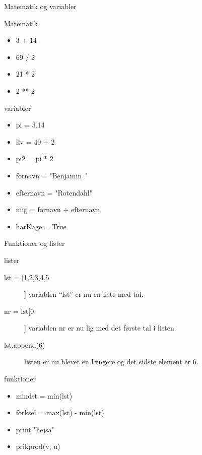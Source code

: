 \documentclass[12pt,t]{beamer}
\begin{document}
     \begin{frame}{Matematik og variabler}
         \vspace{-1em}
         \begin{block}{Matematik}
            \begin{itemize}
                \item 3 + 14 \pause
                \item 69 / 2 \pause
                \item 21 * 2 \pause
                \item 2 ** 2
            \end{itemize}
         \end{block}
         \pause
         \begin{block}{variabler}
             \begin{itemize}
                 \item pi  = 3.14
                \pause \item liv = 40 + 2
                \pause \item pi2 = pi * 2
                \pause \item fornavn = "Benjamin~"
                \pause \item efternavn = "Rotendahl"
                \pause \item mig = fornavn + efternavn
                \pause \item harKage = True
             \end{itemize}
         \end{block}
     \end{frame}

    \begin{frame}{Funktioner og lister}
        \begin{block}{lister}
            \begin{description}
                \item[lst = [1,2,3,4,5]] variablen ``lst'' er nu en liste med
                tal. \pause
                \item[nr = lst[0]] variablen nr er nu lig med det første tal i
                listen. \pause
                \item[lst.append(6)] listen er nu blevet en længere og det sidste
                element er $6$.
            \end{description}
        \end{block}
        \pause
        \begin{block}{funktioner}
            \begin{itemize}
                \item mindst = min(lst)
            \pause  \item forksel = max(lst) - min(lst)
            \pause  \item print "hejsa"
            \pause  \item prikprod(v, u)
            \end{itemize}
        \end{block}
    \end{frame}
\end{document}
